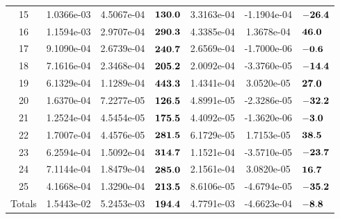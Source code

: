 \documentclass[t, pdftex]{beamer}
\begin{document}
\begin{frame}
\begin{table}[h]
\begin{center}
\begin{tabular}[h]{|c|c|c|M|c|c|M|}
 15  & 1.0366e-03 & 4.5067e-04  & $\bf{130.0 }$  & 3.3163e-04 & -1.1904e-04 & $\bf{ -26.4}$ \\
 16  & 1.1594e-03 & 2.9707e-04  & $\bf{290.3 }$  & 4.3385e-04 & 1.3678e-04 & $\bf{ 46.0 }$ \\
 17  & 9.1090e-04 & 2.6739e-04  & $\bf{240.7 }$  & 2.6569e-04 & -1.7000e-06 & $\bf{ -0.6}$ \\
 18  & 7.1616e-04 & 2.3468e-04  & $\bf{205.2 }$  & 2.0092e-04 & -3.3760e-05 & $\bf{ -14.4}$ \\
 19  & 6.1329e-04 & 1.1289e-04  & $\bf{443.3 }$  & 1.4341e-04 & 3.0520e-05 & $\bf{ 27.0 }$ \\
 20  & 1.6370e-04 & 7.2277e-05  & $\bf{126.5 }$  & 4.8991e-05 & -2.3286e-05 & $\bf{ -32.2}$ \\
 21  & 1.2524e-04 & 4.5454e-05  & $\bf{175.5 }$  & 4.4092e-05 & -1.3620e-06 & $\bf{ -3.0}$ \\
 22  & 1.7007e-04 & 4.4576e-05  & $\bf{281.5 }$  & 6.1729e-05 & 1.7153e-05 & $\bf{ 38.5 }$ \\
 23  & 6.2594e-04 & 1.5092e-04  & $\bf{314.7 }$  & 1.1521e-04 & -3.5710e-05 & $\bf{ -23.7}$ \\
 24  & 7.1144e-04 & 1.8479e-04  & $\bf{285.0 }$  & 2.1561e-04 & 3.0820e-05 & $\bf{ 16.7 }$ \\
 25  & 4.1668e-04 & 1.3290e-04  & $\bf{213.5 }$  & 8.6106e-05 & -4.6794e-05 & $\bf{ -35.2}$ \\
            \hline \hline
Totals & 1.5443e-02 & 5.2453e-03 & $\bf{194.4}$ & 4.7791e-03 & -4.6623e-04   & $\bf{-8.8}$ \\
            \hline
        \end{tabular}
        \label{tab:loo_crud_bmass}
    \end{center}
\end{table}
\end{frame}
\end{document}
